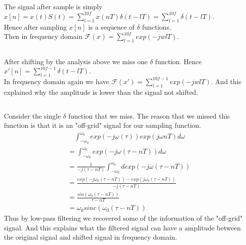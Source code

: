 \documentclass[12pt,letterpaper]{article}
\begin{document}
\subsection{}
The signal after sample is simply $x[n]=x(t)S(t)=\sum_{l=1}^{10f}x(nT)\delta(t-lT)=\sum_{l=1}^{10f}\delta(t-lT)$.\\
Hence after sampling $x[n]$ is a sequence of $\delta$ functions.\\
Then in frequency domain $\mathcal{F}(x)=\sum_{l=1}^{10f}exp(-jwlT)$.
\subsection{}
After shifting by the analysis above we miss one $\delta$ function. Hence $x'[n]=\sum_{l=1}^{10f-1}\delta(t-lT)$.\\
In frequency domain again we have $\mathcal{F}(x')=\sum_{l=1}^{10f-1}exp(-jwlT)$. And this explained why the amplitude is lower than the signal not shifted.
\subsection{}
Consider the single $\delta$ function that we miss. The reason that we missed this function is that it is an "off-grid" signal for our sampling function. 
\begin{align}
&\quad\int_{-\omega_0}^{\omega_0}exp(-j\omega(\tau))exp(j\omega nT)d\omega\\
&=\int_{-\omega_0}^{\omega_0}exp(-j\omega(\tau-nT))d\omega\\
&=\frac{1}{-j(\tau-nT)}\int_{-\omega_0}^{\omega_0}dexp(-j\omega(\tau-nT))\\
&=\frac{exp(-j\omega_0(\tau-nT))-exp(j\omega_0(\tau-nT))}{-j(\tau-nT)}\\
&=\frac{sin(\omega_0(\tau-nT))}{\tau-nT}\\
&=\omega_0sinc(\omega_0(\tau-nT))
\end{align}
Thus by low-pass filtering we recovered some of the information of the "off-grid" signal. And this explains what the filtered signal can have a amplitude between the original signal and shifted signal in frequency domain.
\end{document}
